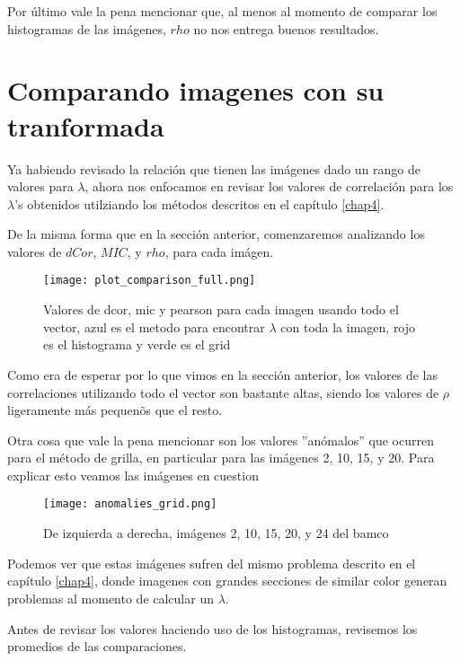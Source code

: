         Por \'ultimo vale la pena mencionar que, al menos al momento de comparar los histogramas de las im\'agenes, $rho$ no nos entrega buenos resultados. 


\section{Comparando imagenes con su tranformada}

    Ya habiendo revisado la relaci\'on que tienen las im\'agenes dado un rango de valores para $\lambda$, ahora nos enfocamos en revisar los valores de correlaci\'on para los $\lambda$'s obtenidos utilziando los m\'etodos descritos en el cap\'itulo \ref{chap4}. 
    
    De la misma forma que en la secci\'on anterior, comenzaremos analizando los valores de $dCor$, $MIC$, y $rho$, para cada im\'agen.
    
    \begin{figure}[H]
        \centering
        \texttt{[image: plot\_comparison\_full.png]}
        \caption{Valores de dcor, mic y pearson para cada imagen usando todo el vector, azul es el metodo para encontrar $\lambda$ con toda la imagen, rojo es el histograma y verde es el grid}
    \end{figure}

    Como era de esperar por lo que vimos en la secci\'on anterior, los valores de las correlaciones utilizando todo el vector son bastante altas, siendo los valores de $\rho$ ligeramente m\'as pequen\~os que el resto. 

    Otra cosa que vale la pena mencionar son los valores ''an\'omalos'' que ocurren para el m\'etodo de grilla, en particular para las im\'agenes 2, 10, 15, y 20. Para explicar esto veamos las im\'agenes en cuestion

    \begin{figure}[H]
        \centering
        \texttt{[image: anomalies\_grid.png]}
        \caption{De izquierda a derecha, im\'agenes 2, 10, 15, 20, y 24 del bamco \cite{KodakLosslessTrueColorImageSuite}}
    \end{figure}

    Podemos ver que estas im\'agenes sufren del mismo problema descrito en el cap\'itulo \ref{chap4}, donde imagenes con grandes secciones de similar color generan problemas al momento de calcular un $\lambda$.

    Antes de revisar los valores haciendo uso de los histogramas, revisemos los promedios de las comparaciones. 

